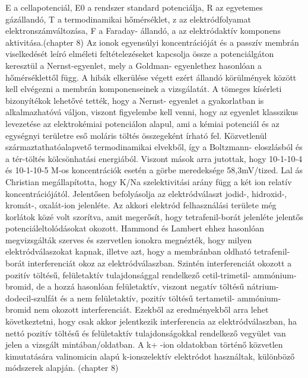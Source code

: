 E a cellapotenciál, E0 a rendszer standard potenciálja, R az egyetemes gázállandó, T a termodinamikai hőmérséklet, z az elektródfolyamat elektronszámváltozása, F a Faraday- állandó, a az elektródaktív komponens aktivitása.(chapter 8) Az ionok egyensúlyi koncentrációját és a passzív membrán viselkedését leíró elméleti feltételezéseket kapcsolja össze a potenciálgáton keresztül a Nernst-egyenlet, mely a Goldman- egyenlethez hasonlóan a hőmérséklettől függ. A hibák elkerülése végett ezért állandó körülmények között kell elvégezni a membrán komponenseinek a vizsgálatát. 
A tömeges kísérleti bizonyítékok lehetővé tették, hogy a Nernst- egyenlet a gyakorlatban is alkalmazhatóvá váljon, viszont figyelembe kell venni, hogy az egyenlet klasszikus levezetése az elektrokémiai potenciálon alapul, ami a kémiai potenciál és az egységnyi területre eső moláris töltés összegeként írható fel. Közvetlenül származtathatóalapvető termodinamikai elvekből, így a Boltzmann- eloszlásból és a tér-töltés kölcsönhatási energiából. 
Viszont mások arra jutottak, hogy 10-1-10-4 és 10-1-10-5 M-os koncentrációk esetén a görbe meredeksége 58,3mV/tized. Lal ás Christian megállapította, hogy K/Na szelektivitási arány függ a két ion relatív koncentrációjától. Jelentősen befolyásolja az elektródválaszt jodid-, hidroxid-, kromát-, oxalát-ion jelenléte. Az akkori elektród felhasználási területe még korlátok közé volt szorítva, amit megerősít, hogy tetrafenil-borát jelenléte jelentős potenciáleltolódásokat okozott. Hammond és Lambert ehhez hasonlóan megvizsgálták szerves és szervetlen ionokra megnézték, hogy milyen elektródválaszokat kapnak, illetve azt, hogy a membránban oldható tetrafenil-borát interferenciát okoz az elektródválaszban. Szintén interferenciát okozott a pozitív töltésű, felületaktív tulajdonsággal rendelkező cetil-trimetil- ammónium-bromid, de a hozzá hasonlóan felületaktív, viszont negatív töltésű nátrium-dodecil-szulfát és a nem felületaktív, pozitív töltésű tertametil- ammónium- bromid nem okozott interferenciát. Ezekből az eredményekből arra lehet következtetni, hogy csak akkor jelentkezik interferencia az elektródválaszban, ha nettó pozitív töltésű és felületaktív tulajdonságokkal rendelkező vegyület van jelen a vizsgált mintában/oldatban. A k+ -ion oldatokban történő közvetlen kimutatására valinomicin alapú k-ionszelektív elektródot használtak, különböző módszerek alapján. (chapter 8)  


